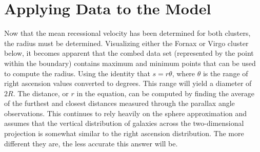 \documentclass[12pt]{article}
\begin{document}
\FloatBarrier
\section{Applying Data  to the Model}
Now that the mean recessional velocity has been determined for both clusters, the radius must be determined. Visualizing either the Fornax or Virgo cluster below, it becomes apparent that the combed data set (represented by the point within the boundary) contains maximum and minimum points that can be used to compute the radius. Using the identity that $s= r\theta$, where $\theta$ is the range of right ascension values converted to degrees. This range will yield a diameter of $2R$. The distance, or $r$ in the equation, can be computed by finding the average of the furthest and closest distances measured through the parallax angle observations. This continues to rely heavily on the sphere approximation and assumes that the vertical distribution of galaxies across the two-dimensional projection is somewhat similar to the right ascension distribution. The more different they are, the less accurate this answer will be.
\FloatBarrier
\end{document}
